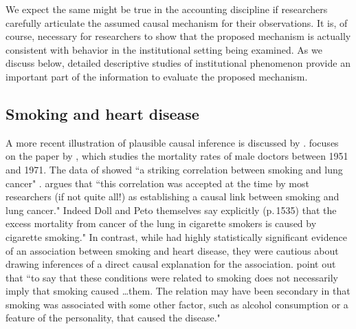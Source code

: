 \documentclass[12pt,reqno,titlepage]{amsart}
\begin{document}
\begin{doublespace}
We expect the same might be true in the accounting discipline if researchers carefully articulate the assumed causal mechanism for their observations.
It is, of course, necessary for researchers to show that the proposed mechanism is actually consistent with behavior in the institutional setting being examined.
As we discuss below, detailed descriptive studies of institutional phenomenon provide an important part of the information to evaluate the proposed mechanism. 

\subsection{Smoking and heart disease}
A more recent illustration of plausible causal inference is discussed by \citet{Gillies2011-GILTRT-3}.
\citet{Gillies2011-GILTRT-3} focuses on the paper by \citet{Doll:1976aa}, which studies the mortality rates of male doctors between 1951 and 1971. 
The data of \citet{Doll:1976aa} showed ``a striking correlation between smoking and lung cancer" \citep[p. 111]{Gillies2011-GILTRT-3}.
 \citet{Gillies2011-GILTRT-3} argues that ``this correlation was accepted at the time by most researchers (if not quite all!) as establishing a causal link between smoking and lung cancer."
Indeed Doll and Peto themselves say explicitly (p.\,1535) that the excess mortality from cancer of the lung in cigarette smokers is caused by cigarette smoking."
In contrast, while \citet{Doll:1976aa} had highly statistically significant evidence of an association between smoking and heart disease, they were cautious about drawing inferences of a direct causal explanation for the association. 
\citet[p.,1528]{Doll:1976aa} point out that ``to say that these conditions were related to smoking does not necessarily imply that smoking caused \dots them. The relation may have been secondary in that smoking was associated with some other factor, such as alcohol consumption or a feature of the personality, that caused the disease."
 

\end{doublespace}
\end{document}
